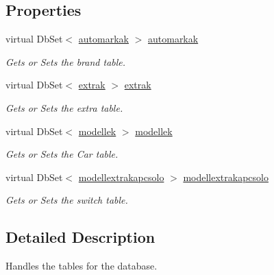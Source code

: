 \subsection*{Properties}
\begin{DoxyCompactItemize}
\item 
virtual Db\+Set$<$ \mbox{\hyperlink{class_car_shop_1_1_data_1_1automarkak}{automarkak}} $>$ \mbox{\hyperlink{class_car_shop_1_1_data_1_1carshopdatabase_entities1_ad4cb24030a1aa956a1f08b8d86331b01}{automarkak}}
\begin{DoxyCompactList}\small\item\em Gets or Sets the brand table. \end{DoxyCompactList}\item 
virtual Db\+Set$<$ \mbox{\hyperlink{class_car_shop_1_1_data_1_1extrak}{extrak}} $>$ \mbox{\hyperlink{class_car_shop_1_1_data_1_1carshopdatabase_entities1_ac592c9a6597676b199fcafbd63f85232}{extrak}}
\begin{DoxyCompactList}\small\item\em Gets or Sets the extra table. \end{DoxyCompactList}\item 
virtual Db\+Set$<$ \mbox{\hyperlink{class_car_shop_1_1_data_1_1modellek}{modellek}} $>$ \mbox{\hyperlink{class_car_shop_1_1_data_1_1carshopdatabase_entities1_af9944547894d4363c4a5c456bdde184f}{modellek}}
\begin{DoxyCompactList}\small\item\em Gets or Sets the Car table. \end{DoxyCompactList}\item 
virtual Db\+Set$<$ \mbox{\hyperlink{class_car_shop_1_1_data_1_1modellextrakapcsolo}{modellextrakapcsolo}} $>$ \mbox{\hyperlink{class_car_shop_1_1_data_1_1carshopdatabase_entities1_a94585ff2ba793f43179a47daa0bc92ce}{modellextrakapcsolo}}
\begin{DoxyCompactList}\small\item\em Gets or Sets the switch table. \end{DoxyCompactList}\end{DoxyCompactItemize}


\subsection{Detailed Description}
Handles the tables for the database. 



